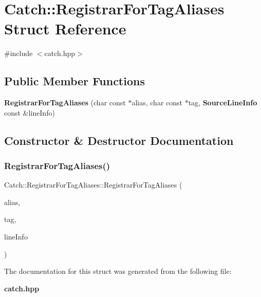 \section{Catch\+:\+:Registrar\+For\+Tag\+Aliases Struct Reference}
\label{struct_catch_1_1_registrar_for_tag_aliases}


{\ttfamily \#include $<$catch.\+hpp$>$}

\subsection*{Public Member Functions}
\begin{DoxyCompactItemize}
\item 
\textbf{ Registrar\+For\+Tag\+Aliases} (char const $\ast$alias, char const $\ast$tag, \textbf{ Source\+Line\+Info} const \&line\+Info)
\end{DoxyCompactItemize}


\subsection{Constructor \& Destructor Documentation}
\mbox{\label{struct_catch_1_1_registrar_for_tag_aliases_ae4e45830e4763bcd65d55d8db9167b69}} 
\subsubsection{Registrar\+For\+Tag\+Aliases()}
{\footnotesize\ttfamily Catch\+::\+Registrar\+For\+Tag\+Aliases\+::\+Registrar\+For\+Tag\+Aliases (\begin{DoxyParamCaption}\item[{char const $\ast$}]{alias,  }\item[{char const $\ast$}]{tag,  }\item[{\textbf{ Source\+Line\+Info} const \&}]{line\+Info }\end{DoxyParamCaption})}



The documentation for this struct was generated from the following file\+:\begin{DoxyCompactItemize}
\item 
\textbf{ catch.\+hpp}\end{DoxyCompactItemize}
